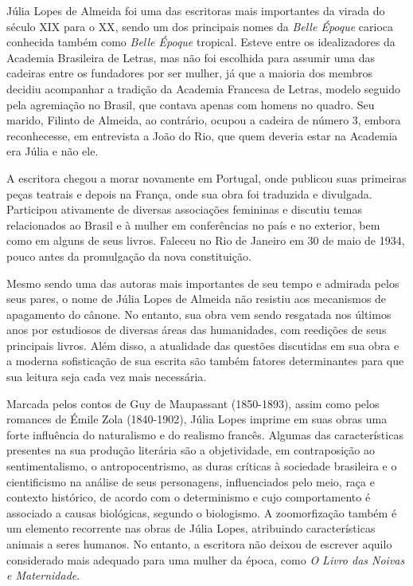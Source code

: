\documentclass[12pt]{extarticle}
\begin{document}
Júlia Lopes de Almeida foi uma das escritoras mais importantes da virada
do século \textsc{XIX} para o \textsc{XX}, sendo um dos principais nomes da \emph{Belle
Époque} carioca conhecida também como \emph{Belle Époque} tropical.
Esteve entre os idealizadores da Academia Brasileira de Letras, mas não
foi escolhida para assumir uma das cadeiras entre os fundadores por ser
mulher, já que a maioria dos membros decidiu acompanhar a tradição da
Academia Francesa de Letras, modelo seguido pela agremiação no Brasil,
que contava apenas com homens no quadro. Seu marido, Filinto de Almeida,
ao contrário, ocupou a cadeira de número 3, embora reconhecesse, em
entrevista a João do Rio, que quem deveria estar na Academia era Júlia
e não ele.




A escritora chegou a morar novamente em Portugal, onde publicou suas
primeiras peças teatrais e depois na França, onde sua obra foi
traduzida e divulgada. Participou ativamente de diversas associações
femininas e discutiu temas relacionados ao Brasil e à mulher em
conferências no país e no exterior, bem como em alguns de seus livros.
Faleceu no Rio de Janeiro em 30 de maio de 1934, pouco antes da
promulgação da nova constituição.

Mesmo sendo uma das autoras mais importantes de seu tempo e admirada
pelos seus pares, o nome de Júlia Lopes de Almeida não resistiu aos
mecanismos de apagamento do cânone. No entanto, sua obra vem sendo
resgatada nos últimos anos por estudiosos de diversas áreas das
humanidades, com reedições de seus principais livros. Além disso, a
atualidade das questões discutidas em sua obra e a moderna sofisticação
de sua escrita são também fatores determinantes para que sua leitura
seja cada vez mais necessária.




Marcada pelos contos de Guy de Maupassant (1850-1893), assim como pelos
romances de Émile Zola (1840-1902), Júlia Lopes imprime em suas obras
uma forte influência do naturalismo e do realismo francês. Algumas das
características presentes na sua produção literária são a objetividade,
em contraposição ao sentimentalismo, o antropocentrismo, as duras
críticas à sociedade brasileira e o cientificismo na análise de seus
personagens, influenciados pelo meio, raça e contexto histórico, de
acordo com o determinismo e cujo comportamento é associado a causas
biológicas, segundo o biologismo. A zoomorfização também é um elemento
recorrente nas obras de Júlia Lopes, atribuindo características animais
a seres humanos. No entanto, a escritora não deixou de escrever aquilo
considerado mais adequado para uma mulher da época, como \emph{O Livro
das Noivas e Maternidade}.
\end{document}
